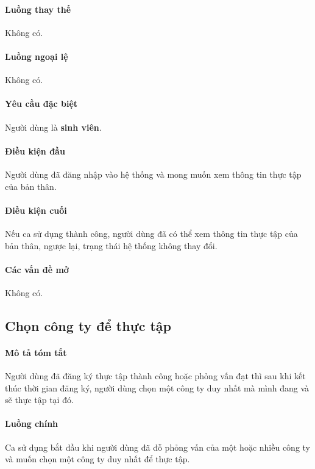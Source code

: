 \documentclass[./../main.tex]{subfiles}
\begin{document}
\paragraph*{Luồng thay thế} Không có.

\paragraph*{Luồng ngoại lệ} Không có.

\paragraph*{Yêu cầu đặc biệt}

Người dùng là \textbf{sinh viên}.

\paragraph*{Điều kiện đầu}

Người dùng đã đăng nhập vào hệ thống và mong muốn xem thông tin thực tập
của bản thân.

\paragraph*{Điều kiện cuối}

Nếu ca sử dụng thành công, người dùng đã có thể xem thông tin thực tập
của bản thân, ngược lại, trạng thái hệ thống không thay đổi.

\paragraph*{Các vấn đề mở}

Không có.

\subsection{Chọn công ty để thực tập}

\paragraph*{Mô tả tóm tắt}

Người dùng đã đăng ký thực tập thành công hoặc phỏng vấn đạt thì sau khi
kết thúc thời gian đăng ký, người dùng chọn một công ty duy nhất mà mình
đang và sẽ thực tập tại đó.


\paragraph*{Luồng chính} Ca sử dụng bắt đầu khi người dùng đã đỗ phỏng vấn của một hoặc nhiều công ty và muốn chọn một công ty duy nhất để thực tập.
\end{document}
